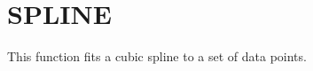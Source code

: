 \section{SPLINE}
\label{sect:spline}

\noindent This function fits a cubic spline to a set of data points.\\
